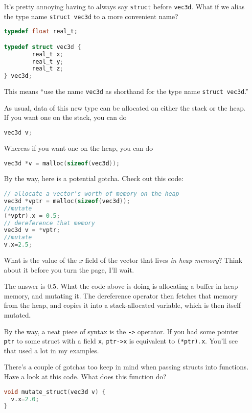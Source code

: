 \documentclass[ebook,11pt,oneside,openany]{memoir}
\newcommand{\cf}[1]{\texttt{#1}}
\begin{document}
It's pretty annoying having to always say \cf{struct} before \cf{vec3d}. What if we alias the type name \cf{struct vec3d} to a more convenient name?

\begin{lstlisting}[language=C]
typedef float real_t;

typedef struct vec3d {
        real_t x;
        real_t y;
        real_t z;
} vec3d;
\end{lstlisting}
This means ``use the name \cf{vec3d} as shorthand for the type name \cf{struct vec3d}.''

As usual, data of this new type can be allocated on either the stack or the heap. If you want one on the stack, you can do

\begin{lstlisting}[language=C]
vec3d v;
\end{lstlisting}

Whereas if you want one on the heap, you can do

\begin{lstlisting}[language=C]
vec3d *v = malloc(sizeof(vec3d));
\end{lstlisting}

\noindent
By the way, here is a potential gotcha. Check out this code:

\begin{lstlisting}[language=C]
// allocate a vector's worth of memory on the heap
vec3d *vptr = malloc(sizeof(vec3d));
//mutate
(*vptr).x = 0.5;
// dereference that memory
vec3d v = *vptr;
//mutate
v.x=2.5;
\end{lstlisting}

What is the value of the $x$ field of the vector that lives \textit{in heap memory}? Think about it before you turn the page, I'll wait.
\pagebreak

The answer is 0.5. What the code above is doing is allocating a buffer in heap memory, and mutating it. The dereference operator then fetches that memory from the heap, and copies it into a stack-allocated variable, which is then itself mutated.

By the way, a neat piece of syntax is the \cf{->} operator. If you had some pointer \cf{ptr} to some struct with a field \cf{x}, \cf{ptr->x} is equivalent to \cf{(*ptr).x}. You'll see that used a lot in my examples.

There's a couple of gotchas too keep in mind when passing structs into functions. Have a look at this code. What does this function do?

\begin{lstlisting}[language=C]
void mutate_struct(vec3d v) {
  v.x=2.0;
}
\end{lstlisting}
\end{document}
